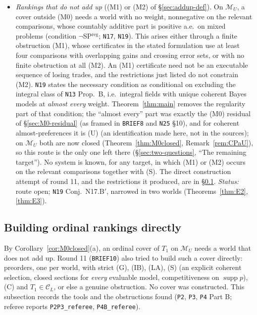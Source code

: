 \documentclass[11pt]{article}
\theoremstyle{definition}
\theoremstyle{remark}
\newcommand{\M}{\mathcal M}
\newcommand{\C}{\mathcal C}
\newcommand{\supp}{\operatorname{supp}}
\newcommand{\src}[1]{\texttt{#1}}
\begin{document}
\begin{itemize}[leftmargin=*]
\item \emph{Rankings that do not add up} ((M1) or (M2) of \S\ref{sec:addup-def}). On $\M_U$, a cover outside (M0) needs a world with no weight, nonnegative on the relevant comparisons, whose countably additive part is positive a.e.\ on mixed problems (condition $\neg$SP$^{\mathrm{reg}}$; \src{N17}, \src{N19}). This arises either through a finite obstruction (M1), whose certificates in the stated formulation use at least four comparisons with overlapping gains and crossing error sets, or with no finite obstruction at all (M2). An (M1) certificate need not be an executable sequence of losing trades, and the restrictions just listed do not constrain (M2). \src{N19} states the necessary condition as conditional on excluding the integral class of \src{N13} Prop.~B, i.e.\ integral fields with unique coherent Bayes models at \emph{almost every} weight. Theorem~\ref{thm:main} removes the regularity part of that condition; the ``almost every'' part was exactly the (M0) residual of \S\ref{sec:M0-residual} (as framed in \src{BRIEF8} and \src{N25} \S10), and for coherent almost-preferences it is (U) (an identification made here, not in the sources); on $\M_U$ both are now closed (Theorem~\ref{thm:M0closed}, Remark~\ref{rem:CPaU}), so this route is the only one left there (\S\ref{sec:two-questions}, ``The remaining target''). No system is known, for any target, in which (M1) or (M2) occurs on the relevant comparisons together with (S). The direct construction attempt of round 11, and the restrictions it produced, are in \S\ref{sec:open-ordinal}. \emph{Status:} route open; \src{N19} Conj.~N17.B$'$, narrowed in two worlds (Theorems~\ref{thm:E2}, \ref{thm:E3}).
\end{itemize}

\subsection{Building ordinal rankings directly}\label{sec:open-ordinal}
By Corollary~\ref{cor:M0closed}(a), an ordinal cover of $T_1$ on $\M_U$ needs a world that does not add up. Round 11 (\src{BRIEF10}) also tried to build such a cover directly: preorders, one per world, with strict (G), (IB), (LA), (S) (an explicit coherent selection, closed sections for \emph{every} evaluable model, competitiveness on $\supp p$), (C) and $T_1\in\C_L$, or else a genuine obstruction. No cover was constructed. This subsection records the tools and the obstructions found (\src{P2}, \src{P3}, \src{P4} Part B; referee reports \src{P2P3\_referee}, \src{P4B\_referee}).
\end{document}
